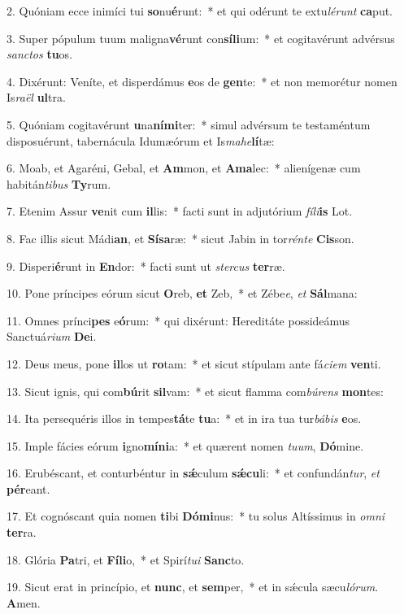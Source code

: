 2. Quóniam ecce inimíci tui \textbf{so}nu\textbf{é}runt:~*  et qui odérunt te extu\textit{lé}\textit{runt} \textbf{ca}put.\

3. Super pópulum tuum maligna\textbf{vé}runt con\textbf{sí}\textbf{li}um:~*  et cogitavérunt advérsus \textit{sanc}\textit{tos} \textbf{tu}os.\

4. Dixérunt: Veníte, et disperdámus \textbf{e}os de \textbf{gen}te:~*  et non memorétur nomen Is\textit{ra}\textit{ël} \textbf{ul}tra.\

5. Quóniam cogitavérunt \textbf{u}na\textbf{ní}\textbf{mi}ter:~*  simul advérsum te testaméntum disposuérunt, tabernácula Idumæórum et Is\textit{ma}\textit{he}\textbf{lí}tæ:\

6. Moab, et Agaréni, Gebal, et \textbf{Am}mon, et \textbf{A}\textbf{ma}lec:~*  alienígenæ cum habitán\textit{ti}\textit{bus} \textbf{Ty}rum.\

7. Etenim Assur \textbf{ve}nit cum \textbf{il}lis:~*  facti sunt in adjutórium \textit{fí}\textit{li}\textbf{is} Lot.\

8. Fac illis sicut Mádi\textbf{an}, et \textbf{Sí}\textbf{sa}ræ:~*  sicut Jabin in tor\textit{rén}\textit{te} \textbf{Cis}son.\

9. Disperi\textbf{é}runt in \textbf{En}dor:~*  facti sunt ut \textit{ster}\textit{cus} \textbf{ter}ræ.\

10. Pone príncipes eórum sicut \textbf{O}reb, \textbf{et} Zeb,~*  et Zébe\textit{e}, \textit{et} \textbf{Sál}mana:\

11. Omnes prínci\textbf{pes} e\textbf{ó}rum:~*  qui dixérunt: Hereditáte possideámus Sanctuá\textit{ri}\textit{um} \textbf{De}i.\

12. Deus meus, pone \textbf{il}los ut \textbf{ro}tam:~*  et sicut stípulam ante fá\textit{ci}\textit{em} \textbf{ven}ti.\

13. Sicut ignis, qui com\textbf{bú}rit \textbf{sil}vam:~*  et sicut flamma com\textit{bú}\textit{rens} \textbf{mon}tes:\

14. Ita persequéris illos in tempes\textbf{tá}te \textbf{tu}a:~*  et in ira tua tur\textit{bá}\textit{bis} \textbf{e}os.\

15. Imple fácies eórum \textbf{i}gno\textbf{mí}\textbf{ni}a:~*  et quærent nomen \textit{tu}\textit{um}, \textbf{Dó}mine.\

16. Erubéscant, et conturbéntur in \textbf{sǽ}culum \textbf{sǽ}\textbf{cu}li:~*  et confundán\textit{tur}, \textit{et} \textbf{pér}eant.\

17. Et cognóscant quia nomen \textbf{ti}bi \textbf{Dó}\textbf{mi}nus:~*  tu solus Altíssimus in \textit{om}\textit{ni} \textbf{ter}ra.\

18. Glória \textbf{Pa}tri, et \textbf{Fí}\textbf{li}o,~*  et Spirí\textit{tu}\textit{i} \textbf{Sanc}to.\

19. Sicut erat in princípio, et \textbf{nunc}, et \textbf{sem}per,~*  et in sǽcula sæcu\textit{ló}\textit{rum}. \textbf{A}men.\

